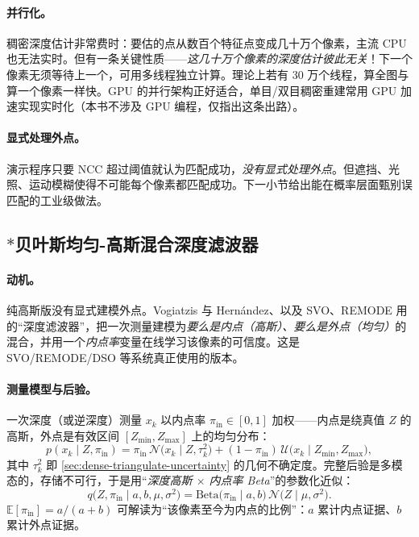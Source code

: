 \paragraph{并行化。}
稠密深度估计非常费时：要估的点从数百个特征点变成几十万个像素，主流 CPU 也无法实时。但有一条关键性质——\emph{这几十万个像素的深度估计彼此无关}！下一个像素无须等待上一个，可用多线程独立计算。理论上若有 30 万个线程，算全图与算一个像素一样快。GPU 的并行架构正好适合，单目/双目稠密重建常用 GPU 加速实现实时化（本书不涉及 GPU 编程，仅指出这条出路）。

\paragraph{显式处理外点。}
演示程序只要 NCC 超过阈值就认为匹配成功，\emph{没有显式处理外点}。但遮挡、光照、运动模糊使得不可能每个像素都匹配成功。下一小节给出能在概率层面甄别误匹配的工业级做法。

\subsection{\texorpdfstring{$*$}{*}贝叶斯均匀-高斯混合深度滤波器}
\label{sec:dense-bayes-filter}

\paragraph{动机。}
纯高斯版没有显式建模外点。Vogiatzis 与 Hernández\cite{vogiatzis2011video}、以及 SVO\cite{forster2017svo}、REMODE\cite{pizzoli2014remode} 用的“深度滤波器”，把一次测量建模为\emph{要么是内点（高斯）、要么是外点（均匀）}的混合，并用一个\emph{内点率}变量在线学习该像素的可信度。这是 SVO/REMODE/DSO 等系统真正使用的版本。

\paragraph{测量模型与后验。}
一次深度（或逆深度）测量 $x_k$ 以内点率 $\pi_{\mathrm{in}}\in[0,1]$ 加权——内点是绕真值 $Z$ 的高斯，外点是有效区间 $[Z_{\min},Z_{\max}]$ 上的均匀分布：
\begin{equation}
  p(x_k\mid Z,\pi_{\mathrm{in}})=\pi_{\mathrm{in}}\,\mathcal{N}\!\bigl(x_k\mid Z,\tau_k^2\bigr)
   +(1-\pi_{\mathrm{in}})\,\mathcal{U}\!\bigl(x_k\mid Z_{\min},Z_{\max}\bigr),
  \label{eq:dense-mix}
\end{equation}
其中 $\tau_k^2$ 即 \cref{sec:dense-triangulate-uncertainty} 的几何不确定度。完整后验是多模态的，存储不可行，于是用“\emph{深度高斯 $\times$ 内点率 Beta}”的参数化近似：
\begin{equation}
  q\!\bigl(Z,\pi_{\mathrm{in}}\mid a,b,\mu,\sigma^2\bigr)=\mathrm{Beta}\!\bigl(\pi_{\mathrm{in}}\mid a,b\bigr)\,\mathcal{N}\!\bigl(Z\mid\mu,\sigma^2\bigr).
  \label{eq:dense-gaussbeta}
\end{equation}
$\mathbb{E}[\pi_{\mathrm{in}}]=a/(a+b)$ 可解读为“该像素至今为内点的比例”：$a$ 累计内点证据、$b$ 累计外点证据。

